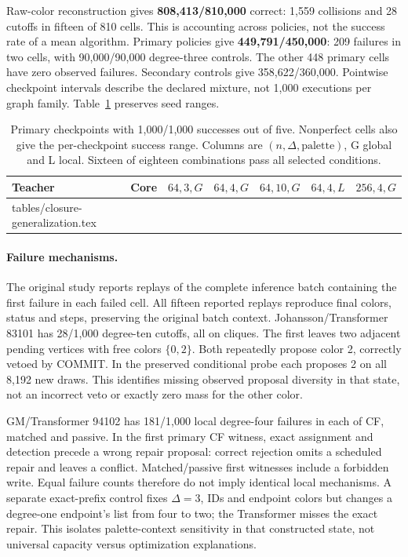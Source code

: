 \documentclass[10pt]{article}
\makeatletter
\let\closureinput\@@input
\makeatother
\begin{document}
Raw-color reconstruction gives \textbf{808,413/810,000} correct: 1,559
collisions and 28 cutoffs in fifteen of 810 cells. This is accounting across
policies, not the success rate of a mean algorithm. Primary policies give
\textbf{449,791/450,000}: 209 failures in two cells, with 90,000/90,000
degree-three controls. The other 448 primary cells have zero observed
failures. Secondary controls give 358,622/360,000.
Pointwise checkpoint intervals describe the declared mixture, not 1,000
executions per graph family. Table~\ref{tab:transfer} preserves seed ranges.

\begin{table}[htbp]\centering\scriptsize
\begin{tabular}{llccccc}
\toprule Teacher & Core & $64,3,G$ & $64,4,G$ & $64,10,G$ & $64,4,L$ & $256,4,G$ \\
\midrule
\closureinput tables/closure-generalization.tex
\bottomrule
\end{tabular}
\caption{Primary checkpoints with 1,000/1,000 successes out of five.
Nonperfect cells also give the per-checkpoint success range. Columns are
$(n,\Delta,\text{palette})$, G global and L local. Sixteen of eighteen
combinations pass all selected conditions.}
\label{tab:transfer}
\end{table}

\paragraph{Failure mechanisms.}
The original study reports replays of the complete inference batch containing
the first failure in each failed cell. All fifteen reported replays reproduce
final colors, status and steps, preserving the original batch context.
Johansson/Transformer 83101 has 28/1,000 degree-ten cutoffs, all on cliques.
The first leaves two adjacent pending vertices with free colors $\{0,2\}$.
Both repeatedly propose color 2, correctly vetoed by COMMIT. In the preserved
conditional probe each proposes 2 on all 8,192 new draws. This identifies
missing observed proposal diversity in that state, not an incorrect veto or
exactly zero mass for the other color.

GM/Transformer 94102 has 181/1,000 local degree-four failures in each of CF,
matched and passive. In the first primary CF witness, exact assignment and
detection precede a wrong repair proposal: correct rejection omits a scheduled
repair and leaves a conflict. Matched/passive first witnesses include a
forbidden write. Equal failure counts therefore do not imply identical local
mechanisms. A separate exact-prefix control fixes $\Delta=3$, IDs and
endpoint colors but changes a degree-one endpoint's list from four to two;
the Transformer misses the exact repair. This isolates palette-context
sensitivity in that constructed state, not universal capacity versus
optimization explanations.
\end{document}
